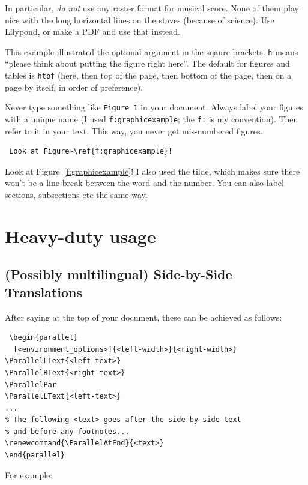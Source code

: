 \documentclass{SMR}
\begin{document}
In particular, \emph{do not} use any raster format for musical score.
None of them play nice with the long horizontal lines on the staves
(because of science). Use Lilypond, or make a PDF and use that instead.

This example illustrated the optional argument in the sqaure brackets.
\texttt{h} means ``please think about putting the figure right here''.
The default for figures and tables is \texttt{htbf} (here, then top of the page,
then bottom of the page, then on a page by itself, in order of preference).

Never type something like \texttt{Figure 1} in your document.
Always label your figures with a unique name (I used \texttt{f:graphicexample};
the \texttt{f:} is my convention). Then refer to it in your text.
This way, you never get mis-numbered figures.

\begin{verbatim}
 Look at Figure~\ref{f:graphicexample}!
\end{verbatim}

Look at Figure~\ref{f:graphicexample}!
I also used the tilde, which makes sure there won't be a line-break between
the word and the number. You can also label sections, subsections etc
the same way.

\section{Heavy-duty usage}
\subsection{(Possibly multilingual) Side-by-Side Translations}
After saying  at the top of your document,
these can be achieved as follows:

\begin{verbatim}
 \begin{parallel}
  [<environment_options>]{<left-width>}{<right-width>}
\ParallelLText{<left-text>}
\ParallelRText{<right-text>}
\ParallelPar
\ParallelLText{<left-text>}
...
% The following <text> goes after the side-by-side text
% and before any footnotes...
\renewcommand{\ParallelAtEnd}{<text>}
\end{parallel}
\end{verbatim}

For example:
\end{document}
